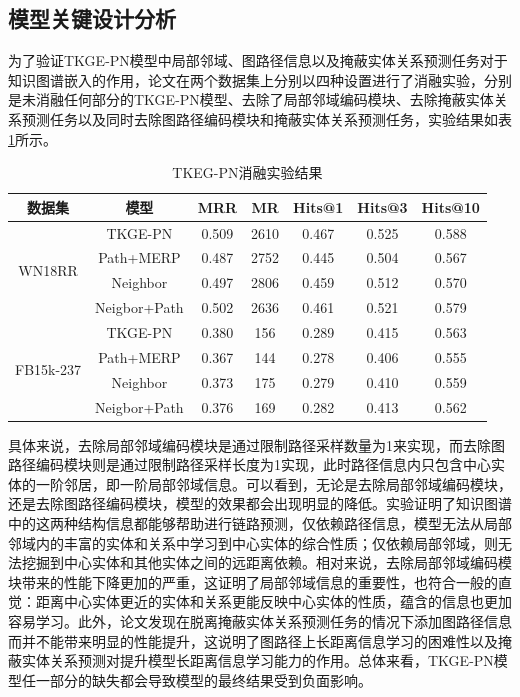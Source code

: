 \subsection{模型关键设计分析}

为了验证TKGE-PN模型中局部邻域、图路径信息以及掩蔽实体关系预测任务对于知识图谱嵌入的作用，论文在两个数据集上分别以四种设置进行了消融实验，分别是未消融任何部分的TKGE-PN模型、去除了局部邻域编码模块、去除掩蔽实体关系预测任务以及同时去除图路径编码模块和掩蔽实体关系预测任务，实验结果如表\ref{ablation_tab}所示。

\begin{table}[htbp]
    \begin{center}
        \caption{TKEG-PN消融实验结果}
        \setlength{\tabcolsep}{10pt}
        \renewcommand{\arraystretch}{1.5}
        \begin{tabular}{*{7}{c}}
            \toprule
            数据集 & 模型 & MRR&MR&Hits@1&Hits@3&	Hits@10\\
            \midrule
            \multirow{4}{*}{WN18RR}&TKGE-PN&0.509&2610&0.467&0.525&0.588\\
            &Path+MERP&0.487&2752&0.445&0.504&0.567\\
            &Neighbor&0.497&2806&0.459&0.512&0.570\\
            &Neigbor+Path&0.502&2636&0.461&0.521&0.579\\
            \cmidrule{1-7}
            \multirow{4}{*}{FB15k-237}&TKGE-PN&0.380&156&0.289&0.415&0.563\\
            &Path+MERP&0.367&144&0.278&0.406&0.555\\
            &Neighbor&0.373&175&0.279&0.410&0.559\\
            &Neigbor+Path&0.376&169&0.282&0.413&0.562\\
            \bottomrule
        \end{tabular}
        \label{ablation_tab}
    \end{center}
\end{table}

具体来说，去除局部邻域编码模块是通过限制路径采样数量为1来实现，而去除图路径编码模块则是通过限制路径采样长度为1实现，此时路径信息内只包含中心实体的一阶邻居，即一阶局部邻域信息。可以看到，无论是去除局部邻域编码模块，还是去除图路径编码模块，模型的效果都会出现明显的降低。实验证明了知识图谱中的这两种结构信息都能够帮助进行链路预测，仅依赖路径信息，模型无法从局部邻域内的丰富的实体和关系中学习到中心实体的综合性质；仅依赖局部邻域，则无法挖掘到中心实体和其他实体之间的远距离依赖。相对来说，去除局部邻域编码模块带来的性能下降更加的严重，这证明了局部邻域信息的重要性，也符合一般的直觉：距离中心实体更近的实体和关系更能反映中心实体的性质，蕴含的信息也更加容易学习。此外，论文发现在脱离掩蔽实体关系预测任务的情况下添加图路径信息而并不能带来明显的性能提升，这说明了图路径上长距离信息学习的困难性以及掩蔽实体关系预测对提升模型长距离信息学习能力的作用。总体来看，TKGE-PN模型任一部分的缺失都会导致模型的最终结果受到负面影响。

